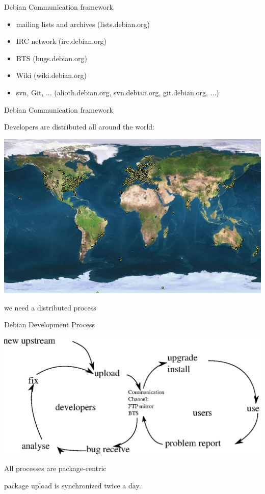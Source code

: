 \documentclass[cjk,dvipdfm,12pt]{beamer}
\begin{document}
\begin{frame}{Debian Communication framework}
 \begin{itemize}
  \item mailing lists and archives (lists.debian.org)
  \item IRC network (irc.debian.org)
  \item BTS (bugs.debian.org)
  \item Wiki (wiki.debian.org)
  \item svn, Git, ... (alioth.debian.org, svn.debian.org,
	git.debian.org, ...)
 \end{itemize}
\end{frame}

\begin{frame}{Debian Communication framework }

Developers are distributed all around the world:

 \includegraphics[width=1\hsize]{image200805/developers-map.jpeg} 

we need a distributed process

\end{frame}

\begin{frame}{Debian Development Process}

\includegraphics[width=1\hsize]{image200805/develcycle.eps} 

All processes are package-centric

package upload is synchronized twice a day.

\end{frame}
\end{document}
